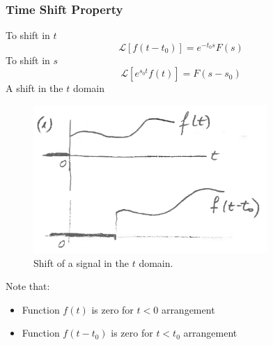\documentclass[12pt,letter]{article}
\numberwithin{ex}{section} %
\numberwithin{re}{section} %
\newcommand{\Laplace}[1]{\ensuremath{\mathcal{L}{\left[#1\right]}}}
\numberwithin{equation}{section}	%
\begin{document}
\subsubsection{Time Shift Property}
To shift in $t$
\begin{equation}
\Laplace{f(t-t_0)} = e^{-t_0s}F(s)
\end{equation}
To shift in $s$
\begin{equation}
\Laplace{e^{s_0t}f(t)} = F(s-s_0)
\end{equation}
A shift in the $t$ domain
		\begin{figure}[H]
			\centering
			\includegraphics[width=3.5in]{../figures/shift_properties}
			\caption{Shift of a signal in the $t$ domain.}
			\label{fig:shift_properties}
		\end{figure}
Note that:
\begin{itemize}[noitemsep, topsep=0pt]
\item Function $f(t)$ is zero for $t<0$ arrangement
\item Function $f(t-t_0)$ is zero for $t<t_0$ arrangement
\end{itemize}
\end{document}
